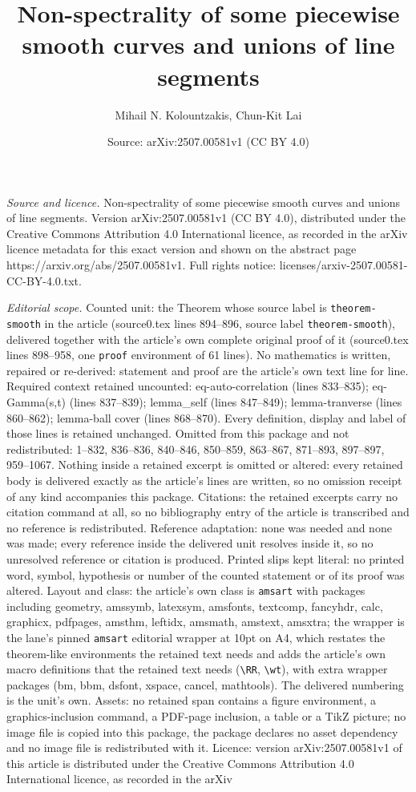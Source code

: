 \documentclass[10pt,a4paper]{amsart}
\title[Non-spectrality of some piecewise smooth curves and unions o]{Non-spectrality of some piecewise smooth curves and unions of line segments}
\author{Mihail N. Kolountzakis, Chun-Kit Lai}
\date{Source: arXiv:2507.00581v1 (CC BY 4.0)}
\begin{document}
\maketitle

\noindent\emph{Source and licence.} Non-spectrality of some piecewise smooth curves and unions of line segments. Version arXiv:2507.00581v1 (CC BY 4.0), distributed under the Creative Commons Attribution 4.0 International licence, as recorded in the arXiv licence metadata for this exact version and shown on the abstract page https://arxiv.org/abs/2507.00581v1. Full rights notice: licenses/arxiv-2507.00581-CC-BY-4.0.txt.\par\smallskip

\noindent\textit{Editorial scope.} Counted unit: the Theorem whose source label is \texttt{theorem-smooth} in the article (source0.tex lines 894--896, source label \texttt{theorem-smooth}), delivered together with the article's own complete original proof of it (source0.tex lines 898--958, one \texttt{proof} environment of 61 lines). No mathematics is written, repaired or re-derived: statement and proof are the article's own text line for line. Required context retained uncounted: eq-auto-correlation (lines 833--835); eq-Gamma(s,t) (lines 837--839); lemma\_self (lines 847--849); lemma-tranverse (lines 860--862); lemma-ball cover (lines 868--870). Every definition, display and label of those lines is retained unchanged. Omitted from this package and not redistributed: 1--832, 836--836, 840--846, 850--859, 863--867, 871--893, 897--897, 959--1067. Nothing inside a retained excerpt is omitted or altered: every retained body is delivered exactly as the article's lines are written, so no omission receipt of any kind accompanies this package. Citations: the retained excerpts carry no citation command at all, so no bibliography entry of the article is transcribed and no reference is redistributed. Reference adaptation: none was needed and none was made; every reference inside the delivered unit resolves inside it, so no unresolved reference or citation is produced. Printed slips kept literal: no printed word, symbol, hypothesis or number of the counted statement or of its proof was altered. Layout and class: the article's own class is \texttt{amsart} with packages including geometry, amssymb, latexsym, amsfonts, textcomp, fancyhdr, calc, graphicx, pdfpages, amsthm, leftidx, amsmath, amstext, amsxtra; the wrapper is the lane's pinned \texttt{amsart} editorial wrapper at 10pt on A4, which restates the theorem-like environments the retained text needs and adds the article's own macro definitions that the retained text needs (\texttt{\textbackslash RR}, \texttt{\textbackslash wt}), with extra wrapper packages (bm, bbm, dsfont, xspace, cancel, mathtools). The delivered numbering is the unit's own. Assets: no retained span contains a figure environment, a graphics-inclusion command, a PDF-page inclusion, a table or a TikZ picture; no image file is copied into this package, the package declares no asset dependency and no image file is redistributed with it. Licence: version arXiv:2507.00581v1 of this article is distributed under the Creative Commons Attribution 4.0 International licence, as recorded in the arXiv 
\end{document}
